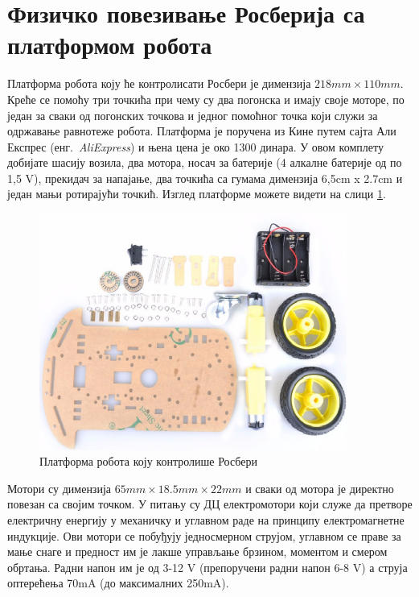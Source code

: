 \documentclass[12pt,oneside]{memoir}
\theoremstyle{remark}
\begin{document}
\section{Физичко повезивање Росберија са платформом робота}
Платформа робота коју ће контролисати Росбери је димензија $218mm \times 110mm$. Креће се помоћу три точкића при чему су два погонска и имају своје моторе, по један за сваки од погонских точкова и једног помоћног точка који служи за одржавање равнотеже робота. Платформа је поручена из Кине путем сајта Али Експрес (енг.~{\em AliExpress}) и њена цена је око 1300 динара. У овом комплету добијате шасију возила, два мотора, носач за батерије (4 алкалне батерије од по 1,5 V), прекидач за напајање, два точкића са гумама димензија 6,5cm x 2.7cm и један мањи ротирајући точкић. Изглед платформе можете видети на слици \ref{fig:platformarobota}. 

\begin{figure}[!ht]
\centering
\includegraphics[width=0.9\textwidth]{slike/platforma.png}
\caption{Платформа робота коју контролише Росбери}
\label{fig:platformarobota}
\end{figure}

Мотори су димензија $65mm \times 18.5mm \times 22mm$ и сваки од мотора је директно повезан са својим точком. У питању су ДЦ електромотори који служе да претворе електричну енергију у механичку и углавном раде на принципу електромагнетне индукције. Ови мотори се побуђују једносмерном струјом, углавном се праве за мање снаге и предност им је лакше управљање брзином, моментом и смером обртања. Радни напон им је од 3-12 V (препоручени радни напон 6-8 V) а струја оптерећења 70mA (до максималних 250mA).
\end{document}
